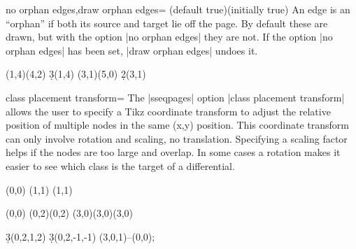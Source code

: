 \documentclass{ltxdoc}
\begin{document}
\begin{sseqdata}[name=ex1,degree={#1}{1-#1}]
\begin{keylist}{no orphan edges,draw orphan edges= (default true)(initially true)}
An edge is an ``orphan'' if both its source and target lie off the page. By default these are drawn, but with the option |no orphan edges| they are not. If the option |no orphan edges| has been set, |draw orphan edges| undoes it.
\begin{codeexample}[]
\begin{sseqdata}[name=orphan edges example,cohomological Serre grading, 
                x range={0}{3}, y range={0}{3}]
\class(1,4)\class(4,2)
\d3(1,4)
\class(3,1)\class(5,0)
\d2(3,1)
\end{sseqdata}
\printpage[name=orphan edges example]
\hskip1cm
\printpage[name=orphan edges example,no orphan edges]
\end{codeexample}
\end{keylist}


\begin{key}{class placement transform=}
The |sseqpages| option |class placement transform| allows the user to specify a Tikz coordinate transform to adjust the relative position of multiple nodes in the same (x,y) position. This coordinate transform can only involve rotation and scaling, no translation. Specifying a scaling factor helps if the nodes are too large and overlap. In some cases a rotation makes it easier to see which class is the target of a differential.
\begin{codeexample}[width=5cm]
\begin{sseqpage}[classes={draw=none},class placement transform={xscale=3},
                 xscale=2, x axis extend end=0.7cm]
\class["$\mathbb{Z}$"](0,0)
\class["$\mathbb{Z}/2$"](1,1)
\class["$\mathbb{Z}/3$"](1,1)
\end{sseqpage}
\end{codeexample}
\begin{codeexample}[width=5cm]
\begin{sseqpage}[classes=fill,class placement transform={rotate=40},
                 cohomological Serre grading,differentials=blue,scale=0.7]
\class(0,0)
\class(0,2)\class(0,2)
\class[red](3,0)\class[green](3,0)\class[blue](3,0)

\d3(0,2,1,2)
\d3(0,2,-1,-1)
\draw[->,red](3,0,1)--(0,0);
\end{sseqpage}
\end{codeexample}
\end{key}


\end{sseqdata}
\end{document}
